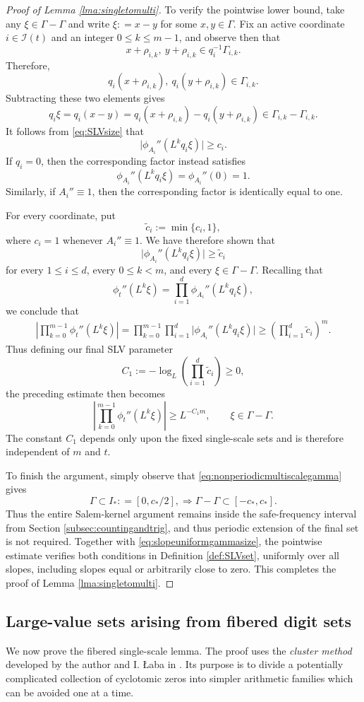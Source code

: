 \documentclass[12pt]{amsart}
\numberwithin{equation}{section}
\begin{document}
\begin{proof}[Proof of Lemma \ref{lma:singletomulti}]
To verify the pointwise lower bound, take any
$\xi\in\Gamma-\Gamma$ and write $\xi : = x - y$ for some $x,y \in \Gamma$. Fix an active coordinate $i\in\mathcal I(t)$ and an integer $0\leq k \leq m -1$, and observe then that
\[
x+\rho_{i,k},
\ y+\rho_{i,k}
\in q_i^{-1}\Gamma_{i,k}.
\]
Therefore,
\[
q_i(x+\rho_{i,k}),
\ q_i(y+\rho_{i,k})
\in\Gamma_{i,k}.
\]
Subtracting these two elements gives
\[
q_i\xi
=
q_i(x-y)
=
q_i(x+\rho_{i,k})
-
q_i(y+\rho_{i,k})
\in
\Gamma_{i,k}-\Gamma_{i,k}.
\]
It follows from \eqref{eq:SLVsize} that
\[
\bigl|\phi_{A_i}''(L^kq_i\xi)\bigr|
\geq c_i.
\]
If $q_i=0$, then the corresponding factor instead satisfies
\[
\phi_{A_i}''(L^kq_i\xi)
=
\phi_{A_i}''(0)
=
1.
\]
Similarly, if $A_i''\equiv1$, then the corresponding factor is identically equal to one.

For every coordinate, put
\[
\widetilde c_i:=\min\{c_i,1\},
\]
where $c_i=1$ whenever $A_i''\equiv1$.  We have therefore shown that
\[
\bigl|\phi_{A_i}''(L^kq_i\xi)\bigr|
\geq\widetilde c_i
\]
for every $1\leq i\leq d$, every $0\leq k<m$, and every
$\xi\in\Gamma-\Gamma$.  Recalling that
\[
\phi_t''(L^k\xi)
=
\prod_{i=1}^d
\phi_{A_i}''(L^kq_i\xi),
\]
we conclude that
\begin{align*}
\left|
\prod_{k=0}^{m-1}\phi_t''(L^k\xi)
\right|
=
\prod_{k=0}^{m-1}
\prod_{i=1}^d
\bigl|\phi_{A_i}''(L^kq_i\xi)\bigr|
\geq
\left(
\prod_{i=1}^d\widetilde c_i
\right)^m.
\end{align*}
Thus defining our final SLV parameter
\[
C_1
:=
-\log_L
\left(
\prod_{i=1}^d\widetilde c_i
\right)
\geq0,
\]
the preceding estimate then becomes
\[
\left|
\prod_{k=0}^{m-1}\phi_t''(L^k\xi)
\right|
\geq
L^{-C_1m},
\qquad
\xi\in\Gamma-\Gamma.
\]
The constant $C_1$ depends only upon the fixed single-scale sets and is therefore independent of $m$ and $t$.

To finish the argument, simply observe that \eqref{eq:nonperiodicmultiscalegamma} gives
\[
\Gamma\subset I_* : =[0,c_*/2], \Longrightarrow \Gamma - \Gamma \subset [-c_*, c_*].
\]
Thus the entire Salem-kernel argument remains inside the safe-frequency interval from Section \ref{subsec:countingandtrig}, and thus periodic extension of the final set is not required.  Together with \eqref{eq:slopeuniformgammasize}, the pointwise estimate verifies both conditions in Definition \ref{def:SLVset}, uniformly over all slopes, including slopes equal or arbitrarily close to zero.  This completes the proof of Lemma \ref{lma:singletomulti}.
\end{proof}


\subsection{Large-value sets arising from fibered digit sets}\label{subsec:SLVfiberconst}
We now prove the fibered single-scale lemma.  The proof uses the \textit{cluster method} developed by the author and I. {\L}aba in \cite{LM}.\label{subsec:clustermethod}  Its purpose is to divide a potentially complicated collection of cyclotomic zeros into simpler arithmetic families which can be avoided one at a time.
\end{document}
